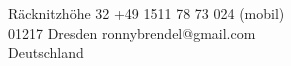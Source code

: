 {\Huge \name}
\vspace{0.5cm}

R\"acknitzh\"ohe 32 \hfill +49 1511 78 73 024 (mobil)\\
01217 Dresden \hfill ronnybrendel@gmail.com\\
Deutschland \hfill

\vspace{0.6cm}

